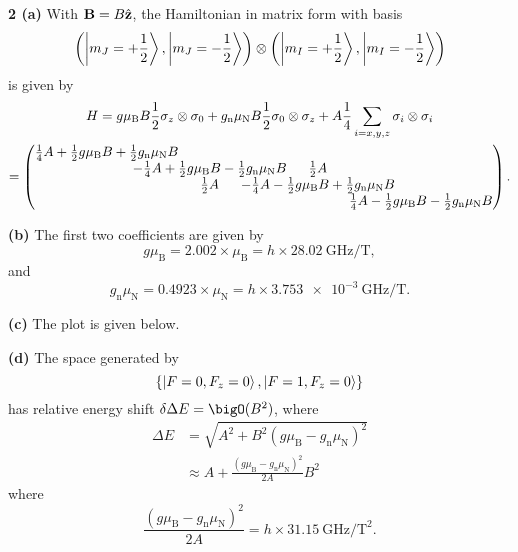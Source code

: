 \documentclass{article}
\makeatletter
\newcommand*{\shifttext}[1]{%
  \settowidth{\@tempdima}{#1}%
  \hspace{-\@tempdima}#1%
}
\newcommand{\plabel}[1]{%
\shifttext{\textbf{#1}\quad}%
}
\newcommand{\prule}{%
\begin{center}%
\hdashrule[0.5ex]{.99\linewidth}{1pt}{1pt 2.5pt}%
\end{center}%
}
\makeatother
\begin{document}
\prule

\plabel{2 (a)}%
With $\vb{B} = B \hat{\vb{z}}$, the Hamiltonian in matrix form with basis
\[ \qty(\ket{m_J=+\frac{1}{2}},\ket{m_J=-\frac{1}{2}}) \otimes \qty(\ket{m_I=+\frac{1}{2}},\ket{m_I=-\frac{1}{2}}) \]
is given by
\begin{gather*}
    H = g \mu_{\mathrm{B}} B \frac{1}{2} \sigma_z \otimes \sigma_0 + g_{\mathrm{n}} \mu_{\mathrm{N}} B \frac{1}{2} \sigma_0 \otimes \sigma_z + A \frac{1}{4} \sum_{i=x,y,z} \sigma_i\otimes \sigma_i \\
    = \arraycolsep=-17pt \begin{pmatrix}
        \frac{1}{4} A + \frac{1}{2} g\mu_{\mathrm{B}} B + \frac{1}{2} g_{\mathrm{n}} \mu_{\mathrm{N}} B & & & \\
        & -\frac{1}{4} A + \frac{1}{2} g\mu_{\mathrm{B}} B - \frac{1}{2} g_{\mathrm{n}} \mu_{\mathrm{N}} B & \frac{1}{2} A \\
        & \frac{1}{2} A & -\frac{1}{4} A - \frac{1}{2} g\mu_{\mathrm{B}} B + \frac{1}{2} g_{\mathrm{n}} \mu_{\mathrm{N}} B \\
        & & & \frac{1}{4} A - \frac{1}{2} g\mu_{\mathrm{B}} B - \frac{1}{2} g_{\mathrm{n}} \mu_{\mathrm{N}} B
    \end{pmatrix}.
\end{gather*}

\plabel{(b)}%
The first two coefficients are given by
\[ g\mu_{\mathrm{B}} = 2.002 \times \mu_{\mathrm{B}} = h\times \SI{28.02}{\giga\hertz\per\tesla}, \]
and
\[ g_{\mathrm{n}} \mu_{\mathrm{N}} = 0.4923 \times \mu_{\mathrm{N}} = h \times \SI{3.753e-3}{\giga\hertz\per\tesla}. \]

\plabel{(c)}%
The plot is given below.
\begin{center}
\end{center}

\plabel{(d)}%
The space generated by
\[ \qty{\ket{F=0,F_z=0}, \ket{F=1,F_z=0}} \]
has relative energy shift $\delta \Delta E = \bigO(B^2)$, where
\begin{align*}
    \Delta E &= \sqrt{A^2 + B^2(g \mu_{\mathrm{B}} - g_{\mathrm{n}} \mu_{\mathrm{N}})^2} \\
    &\approx A + \frac{(g \mu_{\mathrm{B}} - g_{\mathrm{n}} \mu_{\mathrm{N}})^2}{2A} B^2
\end{align*}
where
\[ \frac{(g \mu_{\mathrm{B}} - g_{\mathrm{n}} \mu_{\mathrm{N}})^2}{2A} = h\times \SI{31.15}{\giga\hertz\per\square\tesla}. \]

% 
% 
\end{document}
